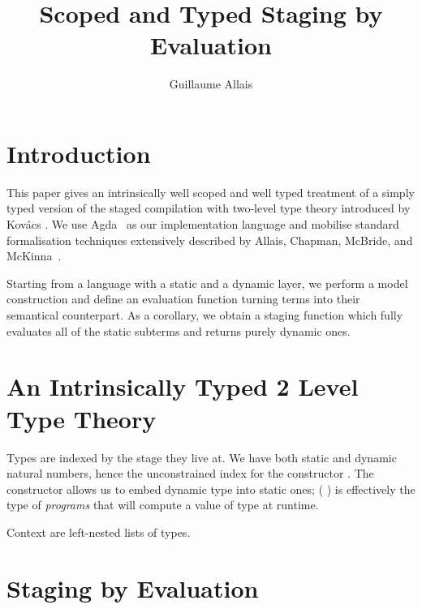 \documentclass{article}
\title{Scoped and Typed Staging by Evaluation}
\author{Guillaume Allais}
\begin{document}
\maketitle

\section{Introduction}

This paper gives an intrinsically well scoped and well typed
treatment of a simply typed version of the staged compilation
with two-level type theory introduced by
Kov{\'{a}}cs \cite{DBLP:journals/pacmpl/Kovacs22}.
%
We use Agda~\cite{DBLP:conf/afp/Norell08}
as our implementation language and
mobilise standard formalisation
techniques extensively described by Allais, Chapman,
McBride, and McKinna~\cite{DBLP:conf/cpp/Allais0MM17}.

Starting from a language with a static and a dynamic layer,
we perform a model construction and define an evaluation
function turning terms into their semantical counterpart.
%
As a corollary, we obtain a staging function which
fully evaluates all of the static subterms and returns
purely dynamic ones.


\section{An Intrinsically Typed 2 Level Type Theory}



Types are indexed by the stage they live at.
%
We have both static and dynamic natural numbers,
hence the unconstrained index  for the
constructor .
%
The constructor  allows us to embed dynamic
type into static ones; ( ) is effectively
the type of \emph{programs} that will compute a value of
type  at runtime.


Context are left-nested lists of types.




\section{Staging by Evaluation}
\end{document}
